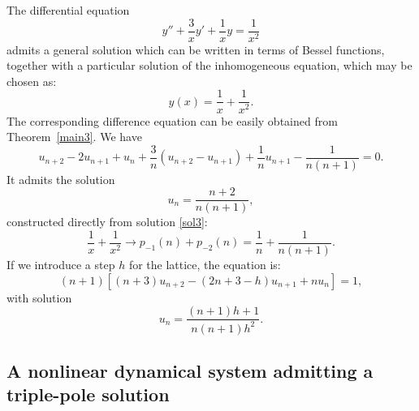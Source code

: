 \documentclass[10pt]{amsart}
\numberwithin{equation}{section}
\theoremstyle{definition}
\begin{document}
The differential equation
\begin{equation}
y'' +\frac{3}{x} y'+\frac{1}{x} y=\frac{1}{x^{2}}
\label{eq11.1}
\end{equation}
admits a general solution which can be written in terms of Bessel functions,
together with a particular solution of the inhomogeneous equation, which
may be chosen as:
\begin{equation}
\label{sol3}
y(x)=\frac{1}{x}+\frac{1}{x^{2}}.
\end{equation}
The corresponding difference equation can be easily obtained from  Theorem~\ref{main3}. We have
\begin{equation}
u_{n+2}-2u_{n+1}+u_{n}+\frac{3}{n}(u_{n+2}-u_{n+1})+\frac{1}{n }u_{n+1}
-\frac{1}{n(n+1)}=0.
\label{eq11.3}
\end{equation}
It admits the solution
\begin{equation}
u_{n}=\frac{n+2}{n(n+1)},
\label{eq11.4}
\end{equation}
constructed directly from solution \eqref{sol3}:
\begin{equation}
\frac{1}{x}+\frac{1}{x^{2}}\to p_{-1}(n)+p_{-2}(n)=\frac{1}{n}+
\frac{1}{n(n+1)}.
\label{eq11.5}
\end{equation}
If we introduce a step $h$ for the lattice, the equation is:
\begin{equation}
(n+1) \left [(n+3 )u_{n+2}-(2n+3-h) u_{n+1}+ n u_{n}\right ] =1,
\label{eq11.6}
\end{equation}
with solution
\begin{equation}
u_{n}=\frac{(n+1)h+1}{n (n+1) h^{2}}.
\label{eq11.7}
\end{equation}

\subsection{A nonlinear dynamical system admitting a triple-pole solution}
\label{sec11.2}
\end{document}
